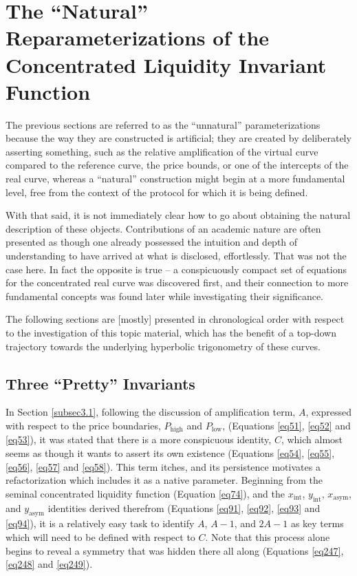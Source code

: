 \documentclass{article}
\begin{document}
\section{The “Natural” Reparameterizations of the Concentrated Liquidity Invariant Function}\label{sec5}

The previous sections are referred to as the “unnatural” parameterizations because the way they are constructed is artificial; they are created by deliberately asserting something, such as the relative amplification of the virtual curve compared to the reference curve, the price bounds, or one of the intercepts of the real curve, whereas a “natural” construction might begin at a more fundamental level, free from the context of the protocol for which it is being defined. 

With that said, it is not immediately clear how to go about obtaining the natural description of these objects. Contributions of an academic nature are often presented as though one already possessed the intuition and depth of understanding to have arrived at what is disclosed, effortlessly. That was not the case here. In fact the opposite is true – a conspicuously compact set of equations for the concentrated real curve was discovered first, and their connection to more fundamental concepts was found later while investigating their significance. 

The following sections are [mostly] presented in chronological order with respect to the investigation of this topic material, which has the benefit of a top-down trajectory towards the underlying hyperbolic trigonometry of these curves. 

\subsection{Three “Pretty” Invariants}\label{subsec5.1}

In Section \ref{subsec3.1}, following the discussion of amplification term, $A$, expressed with respect to the price boundaries, $P_{\text{high}}$ and $P_{\text{low}}$, (Equations \ref{eq51}, \ref{eq52} and \ref{eq53}), it was stated that there is a more conspicuous identity, $C$, which almost seems as though it wants to assert its own existence (Equations \ref{eq54}, \ref{eq55}, \ref{eq56}, \ref{eq57} and \ref{eq58}). This term itches, and its persistence motivates a refactorization which includes it as a native parameter. Beginning from the seminal concentrated liquidity function (Equation \ref{eq74}), and the $x_{\text{int}}$, $y_{\text{int}}$, $x_{\text{asym}}$, and $y_{\text{asym}}$ identities derived therefrom (Equations \ref{eq91}, \ref{eq92}, \ref{eq93} and \ref{eq94}), it is a relatively easy task to identify $A$, $A-1$, and $2A-1$ as key terms which will need to be defined with respect to $C$. Note that this process alone begins to reveal a symmetry that was hidden there all along (Equations \ref{eq247}, \ref{eq248} and \ref{eq249}). 
\end{document}
